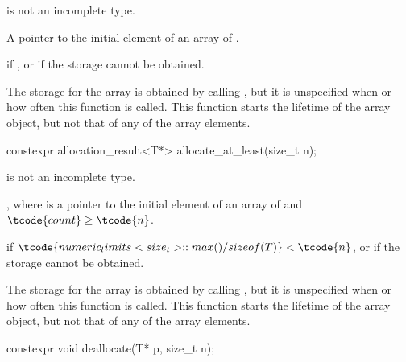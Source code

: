 \begin{itemdescr}
\pnum
\mandates
{} is not an incomplete type.

\pnum
\returns
A pointer to the initial element of an array of  .

\pnum
\throws
{} if
, or
 if the storage cannot be obtained.

\pnum
\remarks
The storage for the array
is obtained by calling ,
but it is unspecified when or how often this
function is called.
This function starts the lifetime of the array object,
but not that of any of the array elements.
\end{itemdescr}

%
\begin{itemdecl}
constexpr allocation_result<T*> allocate_at_least(size_t n);
\end{itemdecl}

\begin{itemdescr}
\pnum
\mandates
{} is not an incomplete type.

\pnum
\returns
{},
where  is a pointer to
the initial element of an array of   and
$\tcode{count} \geq \tcode{n}$.

\pnum
\throws
{}
if $\tcode{numeric_limits<size_t>::max() / sizeof(T)} < \tcode{n}$,
or  if the storage cannot be obtained.

\pnum
\remarks
The storage for the array is obtained by calling ,
but it is unspecified when or how often this function is called.
This function starts the lifetime of the array object,
but not that of any of the array elements.
\end{itemdescr}

%
\begin{itemdecl}
constexpr void deallocate(T* p, size_t n);
\end{itemdecl}

